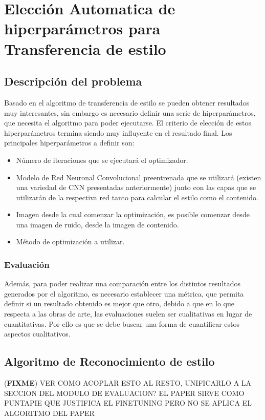\documentclass[a4paper,11pt,spanish]{book}
\newcommand*{\FIXME}[1]{{(\textbf{FIXME}) {#1}}}
\begin{document}
\chapter{Elección Automatica de hiperparámetros para Transferencia de estilo}
  \section{Descripción del problema}
    Basado en el algoritmo de transferencia de estilo se pueden obtener resultados muy interesantes, sin embargo es necesario definir una serie de hiperparámetros,
    que necesita el algoritmo para poder ejecutarse. El criterio de elección de estos hiperparámetros termina siendo muy influyente en el resultado final.
    Los principales hiperparámetros a definir son:
    \begin{itemize}
      \item Número de iteraciones que se ejecutará el optimizador.
      \item Modelo de Red Neuronal Convolucional preentrenada que se utilizará (existen una variedad de CNN presentadas anteriormente) junto con las capas que se utilizarán de la
      respectiva red tanto para calcular el estilo como el contenido.
      \item Imagen desde la cual comenzar la optimización, es posible comenzar desde una imagen de ruido, desde la imagen de contenido.
      \item Método de optimización a utilizar.
    \end{itemize}

    \subsection{Evaluación}
      Además, para poder realizar una comparación entre los distintos resultados generados por el algoritmo, es necesario establecer una métrica, que permita definir si un resultado
      obtenido es mejor que otro, debido a que en lo que respecta a las obras de arte, las evaluaciones suelen ser cualitativas en lugar de cuantitativas. Por ello es que se debe
      buscar una forma de cuantificar estos aspectos cualitativos.
\iffalse
  \section{Algoritmo de Reconocimiento de estilo}
    \FIXME{VER COMO ACOPLAR ESTO AL RESTO, UNIFICARLO A LA SECCION DEL MODULO DE EVALUACION? EL PAPER SIRVE COMO PUNTAPIE QUE JUSTIFICA EL FINETUNING PERO NO SE APLICA EL ALGORITMO DEL PAPER}
\end{document}
